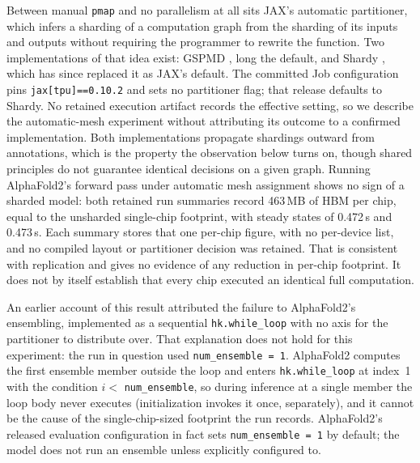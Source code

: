 Between manual \texttt{pmap} and no parallelism at all sits JAX's
automatic partitioner, which infers a sharding of a computation graph
from the sharding of its inputs and outputs without requiring the
programmer to rewrite the function. Two implementations of that idea
exist: GSPMD \citep{xu2021gspmd}, long the default, and Shardy
\citep{shardy2026}, which has since replaced it as JAX's default. The
committed Job configuration pins \texttt{jax[tpu]==0.10.2} and sets no
partitioner flag; that release defaults to Shardy. No retained
execution artifact records the effective setting, so we describe the
automatic-mesh experiment without attributing its outcome to a
confirmed implementation. Both implementations propagate shardings
outward from annotations, which is the property the observation below
turns on, though shared principles do not guarantee identical
decisions on a given graph.
Running AlphaFold2's forward pass under automatic mesh assignment
shows no sign of a sharded model: both retained run summaries record
463\,MB of HBM per chip, equal to the unsharded single-chip footprint,
with steady states of 0.472\,s and 0.473\,s. Each summary stores that
one per-chip figure, with no per-device list, and no compiled
layout or partitioner decision was retained.
That is consistent with replication and gives no evidence of any
reduction in per-chip footprint. It does not by itself establish that
every chip executed an identical full computation.

An earlier account of this result attributed the failure to AlphaFold2's
ensembling, implemented as a sequential \texttt{hk.while\_loop} with no
axis for the partitioner to distribute over. That explanation does not
hold for this experiment: the run in question used
\texttt{num\_ensemble\,=\,1}. AlphaFold2 computes the first ensemble
member outside the loop and enters \texttt{hk.while\_loop} at index~1
with the condition $i <$ \texttt{num\_ensemble}, so during inference
at a single member the loop body never executes (initialization
invokes it once, separately), and it cannot be the cause of the
single-chip-sized footprint the run records. AlphaFold2's released evaluation configuration in fact sets
\texttt{num\_ensemble\,=\,1} by default; the model does not run an
ensemble unless explicitly configured to.

